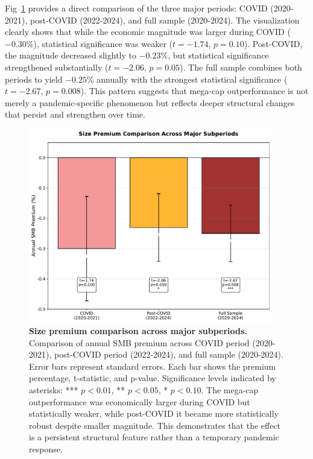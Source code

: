 \documentclass[10pt,letterpaper]{article}
\begin{document}
Fig~\ref{fig:subperiod_comparison} provides a direct comparison of the three major periods: COVID (2020-2021), post-COVID (2022-2024), and full sample (2020-2024). The visualization clearly shows that while the economic magnitude was larger during COVID ($-0.30\%$), statistical significance was weaker ($t=-1.74$, $p=0.10$). Post-COVID, the magnitude decreased slightly to $-0.23\%$, but statistical significance strengthened substantially ($t=-2.06$, $p=0.05$). The full sample combines both periods to yield $-0.25\%$ annually with the strongest statistical significance ($t=-2.67$, $p=0.008$). This pattern suggests that mega-cap outperformance is not merely a pandemic-specific phenomenon but reflects deeper structural changes that persist and strengthen over time.

\begin{figure}[!h]
\centering
\includegraphics[width=0.95\textwidth]{figures/fig8_subperiod_comparison.pdf}
\caption{\textbf{Size premium comparison across major subperiods.}
Comparison of annual SMB premium across COVID period (2020-2021), post-COVID period (2022-2024), and full sample (2020-2024). Error bars represent standard errors. Each bar shows the premium percentage, t-statistic, and p-value. Significance levels indicated by asterisks: *** $p<0.01$, ** $p<0.05$, * $p<0.10$. The mega-cap outperformance was economically larger during COVID but statistically weaker, while post-COVID it became more statistically robust despite smaller magnitude. This demonstrates that the effect is a persistent structural feature rather than a temporary pandemic response.}
\label{fig:subperiod_comparison}
\end{figure}
\end{document}

